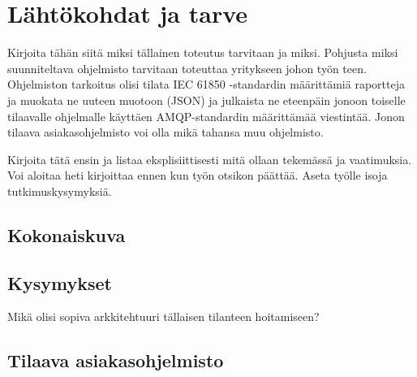 \chapter{Lähtökohdat ja tarve}
\label{ch:lähtökohdat ja tarve}


Kirjoita tähän siitä miksi tällainen toteutus tarvitaan ja miksi. Pohjusta miksi suunniteltava ohjelmisto tarvitaan toteuttaa yritykseen johon työn teen. Ohjelmiston tarkoitus olisi tilata IEC 61850 -standardin määrittämiä raportteja ja muokata ne uuteen muotoon (JSON) ja julkaista ne eteenpäin jonoon toiselle tilaavalle ohjelmalle käyttäen AMQP-standardin määrittämää viestintää. Jonon tilaava asiakasohjelmisto voi olla mikä tahansa muu ohjelmisto.

Kirjoita tätä ensin ja listaa eksplisiittisesti mitä ollaan tekemässä ja vaatimuksia. Voi aloitaa heti kirjoittaa ennen kun työn otsikon päättää. Aseta työlle isoja tutkimuskysymyksiä.
\section{Kokonaiskuva}
\section{Kysymykset}
Mikä olisi sopiva arkkitehtuuri tällaisen tilanteen hoitamiseen?

\section{Tilaava asiakasohjelmisto}




